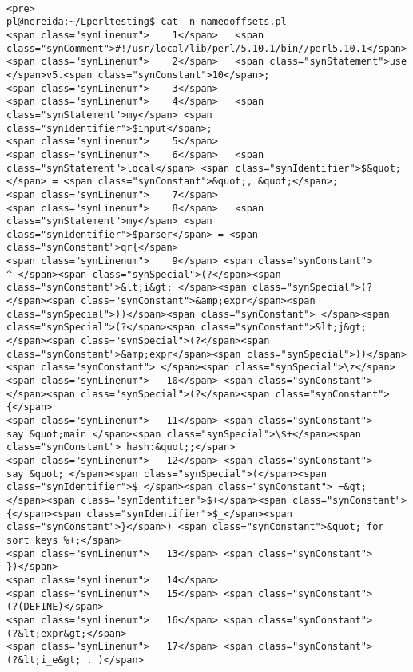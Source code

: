 \begin{verbatim}

<pre>
pl@nereida:~/Lperltesting$ cat -n namedoffsets.pl
<span class="synLinenum">    1</span>   <span class="synComment">#!/usr/local/lib/perl/5.10.1/bin//perl5.10.1</span>
<span class="synLinenum">    2</span>   <span class="synStatement">use </span>v5.<span class="synConstant">10</span>;
<span class="synLinenum">    3</span> 
<span class="synLinenum">    4</span>   <span class="synStatement">my</span> <span class="synIdentifier">$input</span>;
<span class="synLinenum">    5</span> 
<span class="synLinenum">    6</span>   <span class="synStatement">local</span> <span class="synIdentifier">$&quot;</span> = <span class="synConstant">&quot;, &quot;</span>;
<span class="synLinenum">    7</span> 
<span class="synLinenum">    8</span>   <span class="synStatement">my</span> <span class="synIdentifier">$parser</span> = <span class="synConstant">qr{</span>
<span class="synLinenum">    9</span> <span class="synConstant">      ^ </span><span class="synSpecial">(?</span><span class="synConstant">&lt;i&gt; </span><span class="synSpecial">(?</span><span class="synConstant">&amp;expr</span><span class="synSpecial">))</span><span class="synConstant"> </span><span class="synSpecial">(?</span><span class="synConstant">&lt;j&gt; </span><span class="synSpecial">(?</span><span class="synConstant">&amp;expr</span><span class="synSpecial">))</span><span class="synConstant"> </span><span class="synSpecial">\z</span>
<span class="synLinenum">   10</span> <span class="synConstant">        </span><span class="synSpecial">(?</span><span class="synConstant">{</span>
<span class="synLinenum">   11</span> <span class="synConstant">             say &quot;main </span><span class="synSpecial">\$+</span><span class="synConstant"> hash:&quot;;</span>
<span class="synLinenum">   12</span> <span class="synConstant">             say &quot; </span><span class="synSpecial">(</span><span class="synIdentifier">$_</span><span class="synConstant"> =&gt; </span><span class="synIdentifier">$+</span><span class="synConstant">{</span><span class="synIdentifier">$_</span><span class="synConstant">}</span>) <span class="synConstant">&quot; for sort keys %+;</span>
<span class="synLinenum">   13</span> <span class="synConstant">         })</span>
<span class="synLinenum">   14</span> 
<span class="synLinenum">   15</span> <span class="synConstant">      (?(DEFINE)</span>
<span class="synLinenum">   16</span> <span class="synConstant">          (?&lt;expr&gt;</span>
<span class="synLinenum">   17</span> <span class="synConstant">              (?&lt;i_e&gt; . )</span>

\end{verbatim}
